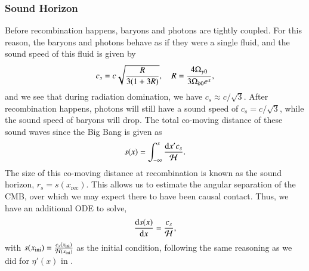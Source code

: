 


\subsubsection{Sound Horizon } \label{sssec:M2:sound_horizon}
Before recombination happens, baryons and photons are tightly coupled. For this reason, the baryons and photons behave as if they were a single fluid, and the sound speed of this fluid is given by 
\begin{equation} \label{eq:M2:theory:soundspeed_R_baryons_and_photons}
    c_s = c \sqrt{\frac{R}{3(1+3R)}},\quad R = \frac{4\Omega_{\gamma 0}}{3\Omega_{b0} e^x},
\end{equation}
and we see that during radiation domination, we have $c_s \approx c/\sqrt{3}$. After recombination happens, photons will still have a sound speed of $c_s=c/\sqrt{3}$, while the sound speed of baryons will drop.  The total co-moving distance of these sound waves since the Big Bang is given as    
\begin{equation} \label{eq:M2:theory:sound_horizon_integral}
    s(x)=\int_{-\infty}^x \frac{\dd x' c_s}{\mathcal{H}}.
\end{equation}
The size of this co-moving distance at recombination is known as the sound horizon, $r_s = s(x_\mathrm{rec})$. This allows us to estimate the angular separation of the CMB, over which we may expect there to have been causal contact. Thus, we have an additional ODE to solve, 
\begin{equation} \label{eq:M2:theory:sound_horizon_ODE}
    \dv{s(x)}{x} = \frac{c_s}{\mathcal{H}},
\end{equation}
with $s(x_\mathrm{ini})=\frac{c_s(x_\mathrm{ini})}{\mathcal{H}(x_\mathrm{ini})}$ as the initial condition, following the same reasoning as we did for $\eta'(x)$ in . 
